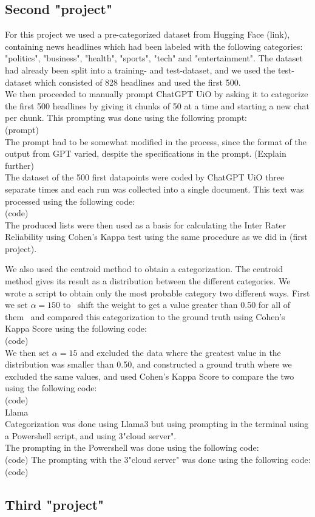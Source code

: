 \begin{flushleft}
\subsection*{Second "project"}
For this project we used a pre-categorized dataset from Hugging Face (link), containing news headlines which had been labeled with the following categories: "politics", "business", "health", "sports", "tech" and "entertainment".
The dataset had already been split into a training- and test-dataset, and we used the test-dataset which consisted of 828 headlines and used the first 500. \\
We then proceeded to manually prompt ChatGPT UiO by asking it to categorize the first 500 headlines by giving it chunks of 50 at a time and starting a new chat per chunk. This prompting 
was done using the following prompt:\\
(prompt)\\
The prompt had to be somewhat modified in the process, since the format of the output from GPT varied, despite the specifications in the prompt. (Explain further)\\[10pt]
The dataset of the 500 first datapoints were coded by ChatGPT UiO three separate times and each run was collected into a single document. This text was processed using the following code:\\
(code)\\
The produced lists were then used as a basis for calculating the Inter Rater Reliability using Cohen's Kappa test using the same procedure as we did in (first project).

We also used the centroid method to obtain a categorization. The centroid method gives its result as a distribution between the different categories. We wrote a script to obtain only the most probable category two different ways.
First we set $\alpha = 150$ to ~shift the weight to get a value greater than 0.50 for all of them~ and compared this categorization to the ground truth using Cohen's Kappa Score using the following code:\\
(code)\\
We then set $\alpha = 15$ and excluded the data where the greatest value in the distribution was smaller than 0.50, and constructed a ground truth where we excluded the same values, 
and used Cohen's Kappa Score to compare the two using the following code:\\
(code)\\

Llama\\
Categorization was done using Llama3 but using prompting in the terminal using a Powershell script, and using 3"cloud server".\\
The prompting in the Powershell was done using the following code:\\
(code)
The prompting with the 3"cloud server" was done using the following code:\\
(code)

\end{flushleft}

\subsection*{Third "project"}
